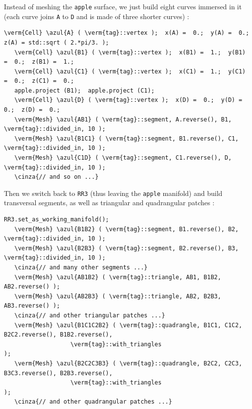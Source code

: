Instead of meshing the {\small\tt apple} surface, we just build eight curves immersed in it
(each curve joins {\small\tt A} to {\small\tt D} and is made of three shorter curves) :

\begin{Verbatim}[commandchars=\\\{\},formatcom=\small\tt,frame=single,
   label=main-\ref{\numb section 2.\numb parag 10}.cpp,rulecolor=\color{coment},
   baselinestretch=0.94,framesep=2mm]
   \verm{Cell} \azul{A} ( \verm{tag}::vertex );  x(A) =  0.;  y(A) =  0.;  z(A) = std::sqrt ( 2.*pi/3. );
   \verm{Cell} \azul{B1} ( \verm{tag}::vertex );  x(B1) =  1.;  y(B1) =  0.;  z(B1) =  1.;
   \verm{Cell} \azul{C1} ( \verm{tag}::vertex );  x(C1) =  1.;  y(C1) =  0.;  z(C1) =  0.;
   apple.project (B1);  apple.project (C1);
   \verm{Cell} \azul{D} ( \verm{tag}::vertex );  x(D) =  0.;  y(D) =  0.;  z(D) =  0.;
   \verm{Mesh} \azul{AB1} ( \verm{tag}::segment, A.reverse(), B1, \verm{tag}::divided_in, 10 );
   \verm{Mesh} \azul{B1C1} ( \verm{tag}::segment, B1.reverse(), C1, \verm{tag}::divided_in, 10 );
   \verm{Mesh} \azul{C1D} ( \verm{tag}::segment, C1.reverse(), D, \verm{tag}::divided_in, 10 );
   \cinza{// and so on ...}
\end{Verbatim}

Then we switch back to {\small\tt RR3} (thus leaving the {\small\tt apple} manifold) and build
transversal segments, as well as triangular and quadrangular patches :

\begin{Verbatim}[commandchars=\\\{\},formatcom=\small\tt,frame=single,
   label=main-\ref{\numb section 2.\numb parag 10}.cpp,rulecolor=\color{coment},
   baselinestretch=0.94,framesep=2mm]
   RR3.set_as_working_manifold();
   \verm{Mesh} \azul{B1B2} ( \verm{tag}::segment, B1.reverse(), B2, \verm{tag}::divided_in, 10 );
   \verm{Mesh} \azul{B2B3} ( \verm{tag}::segment, B2.reverse(), B3, \verm{tag}::divided_in, 10 );
   \cinza{// and many other segments ...}
   \verm{Mesh} \azul{AB1B2} ( \verm{tag}::triangle, AB1, B1B2, AB2.reverse() );
   \verm{Mesh} \azul{AB2B3} ( \verm{tag}::triangle, AB2, B2B3, AB3.reverse() );
   \cinza{// and other triangular patches ...}
   \verm{Mesh} \azul{B1C1C2B2} ( \verm{tag}::quadrangle, B1C1, C1C2, B2C2.reverse(), B1B2.reverse(),
                   \verm{tag}::with_triangles                                           );
   \verm{Mesh} \azul{B2C2C3B3} ( \verm{tag}::quadrangle, B2C2, C2C3, B3C3.reverse(), B2B3.reverse(),
                   \verm{tag}::with_triangles                                           );
   \cinza{// and other quadrangular patches ...}   
\end{Verbatim}

